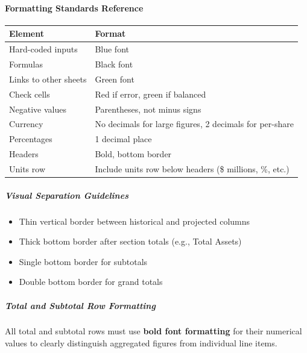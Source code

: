 \documentclass[11pt]{article}
\begin{document}
\paragraph{Formatting Standards Reference}\mbox{}\par

\begingroup
\small
\setlength{\tabcolsep}{2pt}
\begin{longtable}{>{\RaggedRight\arraybackslash\hspace{0pt}}p{}>{\RaggedRight\arraybackslash\hspace{0pt}}p{}}
\toprule
{} \textbf{Element} & \textbf{Format} \\
\midrule
{} Hard-coded inputs & Blue font \\
{} Formulas & Black font \\
{} Links to other sheets & Green font \\
{} Check cells & Red if error, green if balanced \\
{} Negative values & Parentheses, not minus signs \\
{} Currency & No decimals for large figures, 2 decimals for per-share \\
{} Percentages & 1 decimal place \\
{} Headers & Bold, bottom border \\
{} Units row & Include units row below headers (\$ millions, \%, etc.) \\
\bottomrule
\end{longtable}
\endgroup

\subparagraph{Visual Separation Guidelines}\mbox{}\par

\begin{itemize}[leftmargin=*,itemsep=2pt,topsep=2pt]
\item {} Thin vertical border between historical and projected columns
\item {} Thick bottom border after section totals (e.g., Total Assets)
\item {} Single bottom border for subtotals
\item {} Double bottom border for grand totals
\end{itemize}

\subparagraph{Total and Subtotal Row Formatting}\mbox{}\par

All total and subtotal rows must use \textbf{bold font formatting} for their numerical values to clearly distinguish aggregated figures from individual line items.
\end{document}
